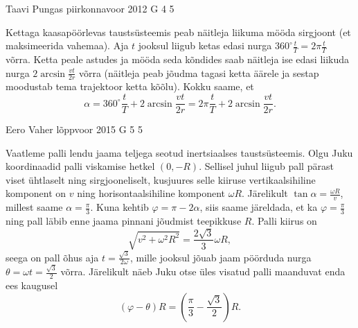 \documentclass[11pt, twoside]{article}
\begin{document}
{%
{Taavi Pungas} %
{piirkonnavoor} %
{2012} %
{G 4} %
{5} %
{

\ifSolution
Kettaga kaasapöörlevas taustsüsteemis peab näitleja liikuma mööda sirgjoont (et maksimeerida vahemaa).
Aja $t$ jooksul liigub ketas edasi nurga $360^\circ\frac{t}{T}=2\pi\frac{t}{T}$ võrra. Ketta peale astudes ja mööda seda kõndides saab näitleja ise edasi liikuda nurga $2\arcsin\frac{vt}{2r}$ võrra (näitleja peab jõudma tagasi ketta äärele ja sestap moodustab tema trajektoor ketta kõõlu). Kokku saame, et 
$$\alpha=360^\circ\frac{t}{T}+2\arcsin\frac{vt}{2r}=2\pi\frac{t}{T}+2\arcsin\frac{vt}{2r}.$$
\fi
}

{Eero Vaher} %
{lõppvoor} %
{2015} %
{G 5} %
{5} %
{

\ifSolution
Vaatleme palli lendu jaama teljega seotud inertsiaalses taustsüsteemis. Olgu Juku koordinaadid palli viskamise hetkel $(0,-R)$. Sellisel juhul liigub pall pärast viset ühtlaselt ning sirgjooneliselt, kusjuures selle kiiruse vertikaalsihiline komponent on $v$ ning horisontaalsihiline komponent $\omega R$. Järelikult $\tan\alpha=\frac{\omega R}{v}$, millest saame $\alpha=\frac{\pi}{3}$. Kuna kehtib $\varphi=\pi-2\alpha$, siis saame järeldada, et ka $\varphi=\frac{\pi}{3}$ ning pall läbib enne jaama pinnani jõudmist teepikkuse $R$. Palli kiirus on
\[
\sqrt{v^2+\omega^2R^2}=\frac{2\sqrt{3}}{3}\omega R,
\]
seega on pall õhus aja $t=\frac{\sqrt{3}}{2\omega}$, mille jooksul jõuab jaam pöörduda nurga $\theta=\omega t=\frac{\sqrt{3}}{2}$ võrra. Järelikult näeb Juku otse üles visatud palli maanduvat enda ees kaugusel
\[
\left(\varphi-\theta\right)R=\left(\frac{\pi}{3}-\frac{\sqrt{3}}{2}\right)R.
\]

\begin{center}
\end{center}
\fi
}

}
\end{document}
